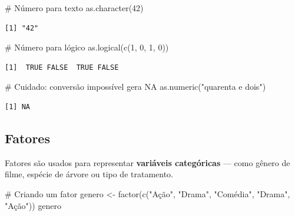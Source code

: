 \documentclass[
  letterpaper,
]{scrbook}
\newenvironment{Shaded}{\begin{snugshade}}{\end{snugshade}}
\newcommand{\CommentTok}[1]{\textcolor[rgb]{0.37,0.37,0.37}{#1}}
\newcommand{\DecValTok}[1]{\textcolor[rgb]{0.68,0.00,0.00}{#1}}
\newcommand{\FunctionTok}[1]{\textcolor[rgb]{0.28,0.35,0.67}{#1}}
\newcommand{\NormalTok}[1]{\textcolor[rgb]{0.00,0.23,0.31}{#1}}
\newcommand{\OtherTok}[1]{\textcolor[rgb]{0.00,0.23,0.31}{#1}}
\newcommand{\StringTok}[1]{\textcolor[rgb]{0.13,0.47,0.30}{#1}}
\begin{document}
\begin{Shaded}
\begin{Highlighting}[]
\CommentTok{\# Número para texto}
\FunctionTok{as.character}\NormalTok{(}\DecValTok{42}\NormalTok{)}
\end{Highlighting}
\end{Shaded}

\begin{verbatim}
[1] "42"
\end{verbatim}

\begin{Shaded}
\begin{Highlighting}[]
\CommentTok{\# Número para lógico}
\FunctionTok{as.logical}\NormalTok{(}\FunctionTok{c}\NormalTok{(}\DecValTok{1}\NormalTok{, }\DecValTok{0}\NormalTok{, }\DecValTok{1}\NormalTok{, }\DecValTok{0}\NormalTok{))}
\end{Highlighting}
\end{Shaded}

\begin{verbatim}
[1]  TRUE FALSE  TRUE FALSE
\end{verbatim}

\begin{Shaded}
\begin{Highlighting}[]
\CommentTok{\# Cuidado: conversão impossível gera NA}
\FunctionTok{as.numeric}\NormalTok{(}\StringTok{"quarenta e dois"}\NormalTok{)}
\end{Highlighting}
\end{Shaded}

\begin{verbatim}
[1] NA
\end{verbatim}

\subsection{Fatores}\label{fatores}

Fatores são usados para representar \textbf{variáveis categóricas} ---
como gênero de filme, espécie de árvore ou tipo de tratamento.

\begin{Shaded}
\begin{Highlighting}[]
\CommentTok{\# Criando um fator}
\NormalTok{genero }\OtherTok{\textless{}{-}} \FunctionTok{factor}\NormalTok{(}\FunctionTok{c}\NormalTok{(}\StringTok{"Ação"}\NormalTok{, }\StringTok{"Drama"}\NormalTok{, }\StringTok{"Comédia"}\NormalTok{, }\StringTok{"Drama"}\NormalTok{, }\StringTok{"Ação"}\NormalTok{))}
\NormalTok{genero}
\end{Highlighting}
\end{Shaded}
\end{document}

